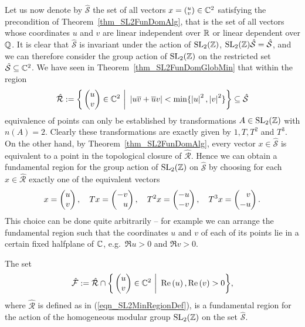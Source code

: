 Let us now denote by $\hat{\mathcal{S}}$ the set of all vectors $x = ({}^u_v) \in \mathbb{C}^2$ satisfying the precondition of Theorem~\ref{thm_SL2FunDomAlg}, that is the set of all vectors whose coordinates $u$ and $v$ are linear independent over $\mathbb{R}$ or linear dependent over $\mathbb{Q}$. It is clear that $\hat{\mathcal{S}}$ is invariant under the action of $\operatorname{SL}_{2}(\mathbb{Z})$, \ie $\operatorname{SL}_{2}(\mathbb{Z})\hat{\mathcal{S}} = \hat{\mathcal{S}}$, and we can therefore consider the group action of $\operatorname{SL}_{2}(\mathbb{Z})$ on the restricted set $\hat{\mathcal{S}} \subseteq \mathbb{C}^2$. We have seen in Theorem~\ref{thm_SL2FunDomGlobMin} that within the region
\begin{equation}
\label{eqn_SL2MinRegionDef}
\hat{\mathcal{R}} := \bigg\{ \begin{pmatrix}u \\ v\end{pmatrix} \in \mathbb{C}^2 \ \bigg| \ \left|u\overline{v} + \overline{u}v\right| < \min \{\left|u\right|^2, \left|v\right|^2\} \bigg\} \subseteq \hat{\mathcal{S}}
\end{equation}
equivalence of points can only be established by transformations $A \in \operatorname{SL}_{2}(\mathbb{Z})$ with $n(A) = 2$. Clearly these transformations are exactly given by $1, T, T^2$ and $T^3$. On the other hand, by Theorem~\ref{thm_SL2FunDomAlg}, every vector $x \in \hat{\mathcal{S}}$ is equivalent to a point in the topological closure of $\hat{\mathcal{R}}$. Hence we can obtain a fundamental region for the group action of $\operatorname{SL}_{2}(\mathbb{Z})$ on $\hat{\mathcal{S}}$ by choosing for each $x \in \hat{\mathcal{R}}$ exactly one of the equivalent vectors 
\begin{equation*}
x = \begin{pmatrix}u \\ v\end{pmatrix},\quad 
Tx = \begin{pmatrix}-v \\ \phantom{+}u\end{pmatrix},\quad
T^2x = \begin{pmatrix}-u \\ -v\end{pmatrix},\quad
T^3x = \begin{pmatrix}\phantom{+}v \\ -u\end{pmatrix}.
\end{equation*}
This choice can be done quite arbitrarily -- for example we can arrange the fundamental region such that the coordinates $u$ and $v$ of each of its points lie in a certain fixed halfplane of $\mathbb{C}$, e.g.\ $\Re{u} > 0$ and $\Re{v} > 0$.
\begin{corollary}
\label{cor_SL2FunDom}
The set
\begin{equation}
\hat{\mathcal{F}} := \hat{\mathcal{R}} \cap \bigg\{ \begin{pmatrix}u \\ v\end{pmatrix} \in \mathbb{C}^2 \ \bigg| \ \operatorname{Re}\left(u\right), \operatorname{Re}\left(v\right) > 0 \bigg\},
\end{equation}
where $\hat{\mathcal{R}}$ is defined as in (\ref{eqn_SL2MinRegionDef}), is a fundamental region for the action of the homogeneous modular group $\operatorname{SL}_{2}(\mathbb{Z})$ on the set $\hat{\mathcal{S}}$.
\end{corollary}
